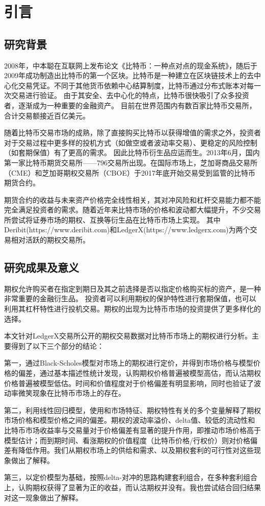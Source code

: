 \chapter{引言}
\section{研究背景}
\par{2008年，中本聪在互联网上发布论文《比特币：一种点对点的现金系统》\cite{Nakamoto_bitcoin:a}，随后于2009年成功制造出比特币的第一个区块。比特币是一种建立在区块链技术上的去中心化交易凭证。不同于其他货币依赖中心结算制度，比特币通过分布式账本对每一次交易进行验证。
由于其安全、去中心化的特点，比特币很快吸引了众多投资者，逐渐成为一种重要的金融资产。
目前在世界范围内有数百家比特币交易所，合计交易额接近百亿美元。
}
\par{随着比特币交易市场的成熟，除了直接购买比特币以获得增值的需求之外，投资者对于交易过程中更多样的投机方式（如做空或者波动率交易）、更稳定的风险控制（如套期保值）有了更高的需求。
因此比特币衍生品应运而生。2013年6月，国内第一家比特币期货交易所——796交易所出现。在国际市场上，芝加哥商品交易所（CME）和芝加哥期权交易所（CBOE）于2017年底开始交易受到监管的比特币期货合约。
}
\par{期货合约的收益与未来资产价格完全线性相关，其对冲风险和杠杆交易能力都不能完全满足投资者的需求。随着近年来比特市场的价格和波动都大幅提升，不少交易所尝试将证券市场的期权、互换等衍生品在比特币市场上实现。
其中Deribit(https://www.deribit.com)和LedgerX(https://www.ledgerx.com)为两个交易相对活跃的期权交易所。}
\section{研究成果及意义}

期权允许购买者在指定到期日及其之前选择是否以指定价格购买标的资产，是一种非常重要的金融衍生品。
投资者可以利用期权的保护特性进行套期保值，也可以利用其杠杆特性进行投机交易。期权的出现为比特币市场的投资提供了更多样化的选择。
\par{本文针对LedgerX交易所公开的期权交易数据对比特币市场上的期权进行分析。主要得到了以下三个部分的结论：}
\par{第一，通过Black-Scholes模型对市场上的期权进行定价，并得到市场价格与模型价格的偏差，通过基本描述性统计发现，认购期权价格普遍被模型高估，而认沽期权价格普遍被模型低估。时间和价值程度对于价格偏差有明显影响，同时也验证了波动率微笑现象在比特币市场上的存在。}
\par{第二，利用线性回归模型，使用和市场特征、期权特性有关的多个变量解释了期权市场价格和模型价格之间的偏差。期权的波动率溢价、delta值、较低的流动性和比特币市场收益率与交易量对于价格偏差有显著的提升作用，即推动市场价格高于模型估计；而到期时间、看涨期权的价值程度（比特币价格/行权价）则对价格偏差有降低作用。我们从期权市场上的供给和需求、以及期权套利的可行性对这些现象做出了解释。}
\par{第三，以定价模型为基础，按照delta-对冲的思路构建套利组合，在多种套利组合上，认购期权获得了显著为正的收益，而认沽期权并没有。我也尝试结合回归结果对这一现象做出了解释。}

